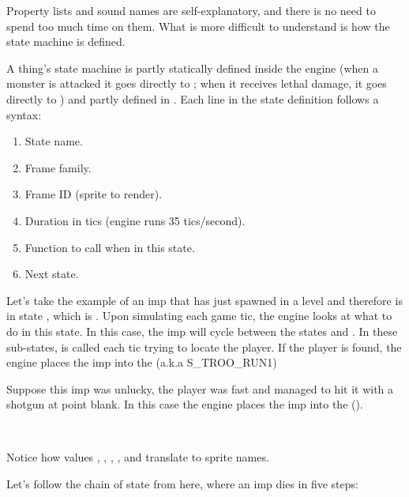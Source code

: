 Property lists and sound names are self-explanatory, and there is no need to spend too much time on them. What is more difficult to understand is how the state machine is defined.\\
\par
A thing's state machine is partly statically defined inside the engine (when a monster is attacked it goes directly to ; when it receives lethal damage, it goes directly to ) and partly defined in . Each line in the state definition follows a syntax:
\begin{enumerate}
\item State name.
\item Frame family.
\item Frame ID (sprite to render).
\item Duration in tics (engine runs 35 tics/second).
\item Function to call when in this state.
\item Next state.
\end{enumerate}
\par
\vspace{5pt}
Let's take the example of an imp that has just spawned in a level and therefore is in state , which is . Upon simulating each game tic, the engine looks at what to do in this state. In this case, the imp will cycle between the states  and . In these sub-states,  is called each tic trying to locate the player. If the player is found, the engine places the imp into the  (a.k.a S\_TROO\_RUN1)\\
\par

Suppose this imp was unlucky, the player was fast and managed to hit it with a shotgun at point blank. In this case the engine places the imp into the  ().\\
\par
{}\\
\par
Notice how values , , , , and  translate to sprite names.\\
\par
{}
\vspace{-10pt}
Let's follow the chain of state from here, where an imp dies in five steps:

